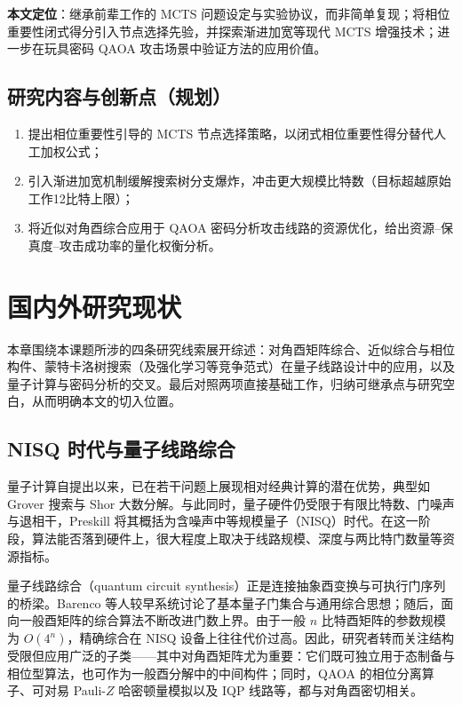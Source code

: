 \documentclass{HDU-Bachelor-Thesis}
\begin{document}
\textbf{本文定位}：继承前辈工作的 MCTS 问题设定与实验协议，而非简单复现；将相位重要性闭式得分引入节点选择先验，并探索渐进加宽等现代 MCTS 增强技术；进一步在玩具密码 QAOA 攻击场景中验证方法的应用价值。

\subsection{研究内容与创新点（规划）}

\begin{enumerate}
  \item 提出相位重要性引导的 MCTS 节点选择策略，以闭式相位重要性得分替代人工加权公式；
  \item 引入渐进加宽机制缓解搜索树分支爆炸，冲击更大规模比特数（目标超越原始工作12比特上限）；
  \item 将近似对角酉综合应用于 QAOA 密码分析攻击线路的资源优化，给出资源--保真度--攻击成功率的量化权衡分析。
\end{enumerate}

\clearpage
\section{国内外研究现状}

本章围绕本课题所涉的四条研究线索展开综述：对角酉矩阵综合、近似综合与相位构件、蒙特卡洛树搜索（及强化学习等竞争范式）在量子线路设计中的应用，以及量子计算与密码分析的交叉。最后对照两项直接基础工作，归纳可继承点与研究空白，从而明确本文的切入位置。

\subsection{NISQ 时代与量子线路综合}

量子计算自提出以来，已在若干问题上展现相对经典计算的潜在优势，典型如 Grover 搜索\cite{grover1996}与 Shor 大数分解\cite{shor1997}。与此同时，量子硬件仍受限于有限比特数、门噪声与退相干，Preskill 将其概括为含噪声中等规模量子（NISQ）时代\cite{preskill2018nisq}。在这一阶段，算法能否落到硬件上，很大程度上取决于线路规模、深度与两比特门数量等资源指标。

量子线路综合（quantum circuit synthesis）正是连接抽象酉变换与可执行门序列的桥梁。Barenco 等人较早系统讨论了基本量子门集合与通用综合思想\cite{barenco1995elementary}；随后，面向一般酉矩阵的综合算法不断改进门数上界\cite{shende2006synthesis}。由于一般 $n$ 比特酉矩阵的参数规模为 $O(4^n)$，精确综合在 NISQ 设备上往往代价过高。因此，研究者转而关注结构受限但应用广泛的子类——其中对角酉矩阵尤为重要：它们既可独立用于态制备与相位型算法，也可作为一般酉分解中的中间构件；同时，QAOA 的相位分离算子、可对易 Pauli-$Z$ 哈密顿量模拟以及 IQP 线路等，都与对角酉密切相关\cite{welch2014diagonal,depth-opt-diagonal2024,grid-diagonal2026}。
\end{document}
